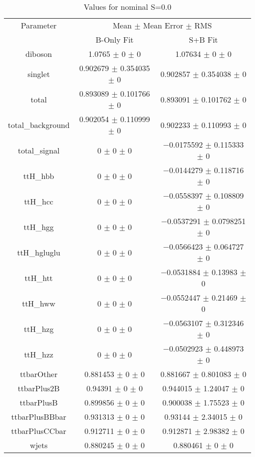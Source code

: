 \begin{table}
\centering
\caption{Values for nominal S=0.0}
\begin{tabular}{ccc}
\toprule
Parameter & \multicolumn{2}{c}{Mean $\pm$ Mean Error $\pm$ RMS}\\
 & B-Only Fit & S+B Fit\\
\midrule
diboson & \num{1.0765} $\pm$ \num{0} $\pm$ \num{0} & \num{1.07634} $\pm$ \num{0} $\pm$ \num{0}\\
singlet & \num{0.902679} $\pm$ \num{0.354035} $\pm$ \num{0} & \num{0.902857} $\pm$ \num{0.354038} $\pm$ \num{0}\\
total & \num{0.893089} $\pm$ \num{0.101766} $\pm$ \num{0} & \num{0.893091} $\pm$ \num{0.101762} $\pm$ \num{0}\\
total\_background & \num{0.902054} $\pm$ \num{0.110999} $\pm$ \num{0} & \num{0.902233} $\pm$ \num{0.110993} $\pm$ \num{0}\\
total\_signal & \num{0} $\pm$ \num{0} $\pm$ \num{0} & \num{-0.0175592} $\pm$ \num{0.115333} $\pm$ \num{0}\\
ttH\_hbb & \num{0} $\pm$ \num{0} $\pm$ \num{0} & \num{-0.0144279} $\pm$ \num{0.118716} $\pm$ \num{0}\\
ttH\_hcc & \num{0} $\pm$ \num{0} $\pm$ \num{0} & \num{-0.0558397} $\pm$ \num{0.108809} $\pm$ \num{0}\\
ttH\_hgg & \num{0} $\pm$ \num{0} $\pm$ \num{0} & \num{-0.0537291} $\pm$ \num{0.0798251} $\pm$ \num{0}\\
ttH\_hgluglu & \num{0} $\pm$ \num{0} $\pm$ \num{0} & \num{-0.0566423} $\pm$ \num{0.064727} $\pm$ \num{0}\\
ttH\_htt & \num{0} $\pm$ \num{0} $\pm$ \num{0} & \num{-0.0531884} $\pm$ \num{0.13983} $\pm$ \num{0}\\
ttH\_hww & \num{0} $\pm$ \num{0} $\pm$ \num{0} & \num{-0.0552447} $\pm$ \num{0.21469} $\pm$ \num{0}\\
ttH\_hzg & \num{0} $\pm$ \num{0} $\pm$ \num{0} & \num{-0.0563107} $\pm$ \num{0.312346} $\pm$ \num{0}\\
ttH\_hzz & \num{0} $\pm$ \num{0} $\pm$ \num{0} & \num{-0.0502923} $\pm$ \num{0.448973} $\pm$ \num{0}\\
ttbarOther & \num{0.881453} $\pm$ \num{0} $\pm$ \num{0} & \num{0.881667} $\pm$ \num{0.801083} $\pm$ \num{0}\\
ttbarPlus2B & \num{0.94391} $\pm$ \num{0} $\pm$ \num{0} & \num{0.944015} $\pm$ \num{1.24047} $\pm$ \num{0}\\
ttbarPlusB & \num{0.899856} $\pm$ \num{0} $\pm$ \num{0} & \num{0.900038} $\pm$ \num{1.75523} $\pm$ \num{0}\\
ttbarPlusBBbar & \num{0.931313} $\pm$ \num{0} $\pm$ \num{0} & \num{0.93144} $\pm$ \num{2.34015} $\pm$ \num{0}\\
ttbarPlusCCbar & \num{0.912711} $\pm$ \num{0} $\pm$ \num{0} & \num{0.912871} $\pm$ \num{2.98382} $\pm$ \num{0}\\
wjets & \num{0.880245} $\pm$ \num{0} $\pm$ \num{0} & \num{0.880461} $\pm$ \num{0} $\pm$ \num{0}\\
\bottomrule
\end{tabular}
\end{table}